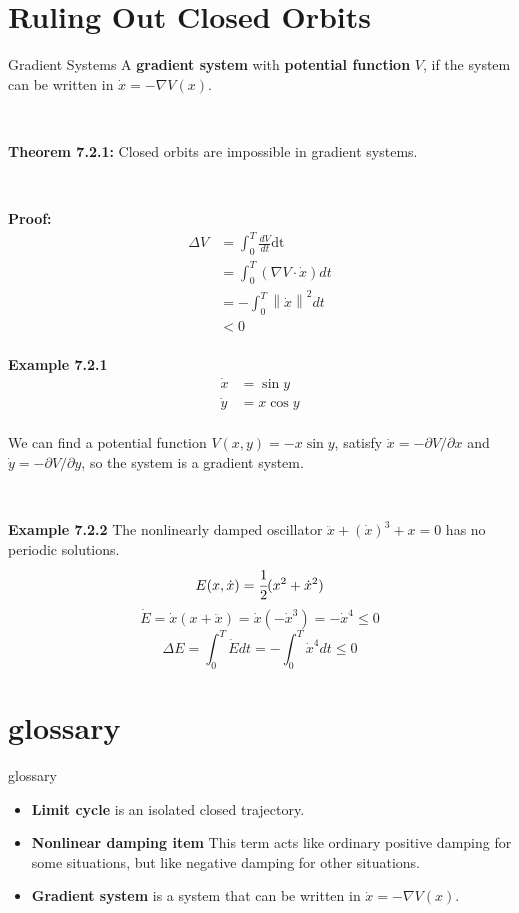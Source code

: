 \documentclass[9pt,aspectratio=43,mathserif,table]{beamer}
\begin{document}
\section{Ruling Out Closed Orbits}
\begin{frame}{Gradient Systems}
	A \textbf{gradient system} with \textbf{potential function} $V$, if the system can be written in $\dot{x}=-\nabla V(x)$.

	$ $

	\textbf{Theorem 7.2.1: } Closed orbits are impossible in gradient systems.

	$ $

	\textbf{Proof:}
	$$
	\begin{aligned}
		\Delta V&=\int_0^T{\frac{dV}{dt}\mathrm{dt}}\\
		&=\int_0^T{\left( \nabla V\cdot \dot{x} \right) dt}\\
		&=-\int_0^T{\left\| \dot{x} \right\| ^2dt}\\
		&<0\\
	\end{aligned}
	$$


\end{frame}

\begin{frame}
	\textbf{Example 7.2.1}
	$$
	\begin{aligned}
		\dot{x}&=\sin y\\
		\dot{y}&=x\cos y\\
	\end{aligned}
	$$

	We can find a potential function $V(x, y) = -x \sin y$, satisfy $\dot{x}=-\partial V/\partial x$ and $\dot{y}=-\partial V/\partial y$, so the system is a gradient system.

	$ $

	\textbf{Example 7.2.2}
	The nonlinearly damped oscillator $\ddot{x} + (\dot{x})^3 + x=0$ has no periodic solutions.
	$$
	E(x, \dot{x})=\cfrac{1}{2}(x^2+\dot{x}^2)
	$$
	$$
	\dot{E}=\dot{x}(x+\ddot{x})=\dot{x}(-\dot{x}^3)=-\dot{x}^4\le0
	$$
	$$
	\Delta E=\int_0^T{\dot{E}dt}=-\int_0^T{\dot{x}^4dt}\le0
	$$
\end{frame}


\section{glossary}
\begin{frame}{glossary}
	\begin{itemize}
			\item \textbf{Limit cycle} is an isolated closed trajectory.
			\item \textbf{Nonlinear damping item} This term acts like ordinary positive damping for some situations, but like negative damping for other situations.
			\item \textbf{Gradient system} is a system that can be written in $\dot{x}=-\nabla V(x)$.
	\end{itemize}
\end{frame}
\end{document}
